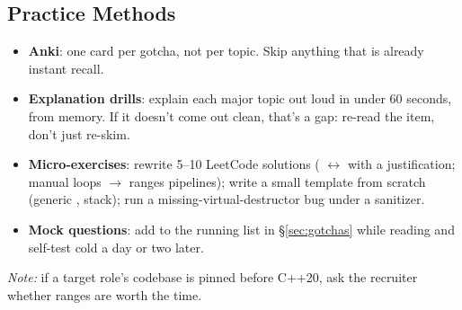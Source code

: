 \subsection*{Practice Methods}
\begin{itemize}
  \item \textbf{Anki}: one card per gotcha, not per topic. Skip anything that is already instant recall.
  \item \textbf{Explanation drills}: explain each major topic out loud in under 60 seconds, from memory.
    If it doesn't come out clean, that's a gap: re-read the item, don't just re-skim.
  \item \textbf{Micro-exercises}: rewrite 5--10 LeetCode solutions ( $\leftrightarrow$ 
    with a justification; manual loops $\to$ ranges pipelines); write a small template from scratch
    (generic , stack); run a missing-virtual-destructor bug under a sanitizer.
  \item \textbf{Mock questions}: add to the running list in \S\ref{sec:gotchas} while reading and self-test
    cold a day or two later.
\end{itemize}

\textit{Note:} if a target role's codebase is pinned before C++20, ask the recruiter whether ranges are worth the time.
